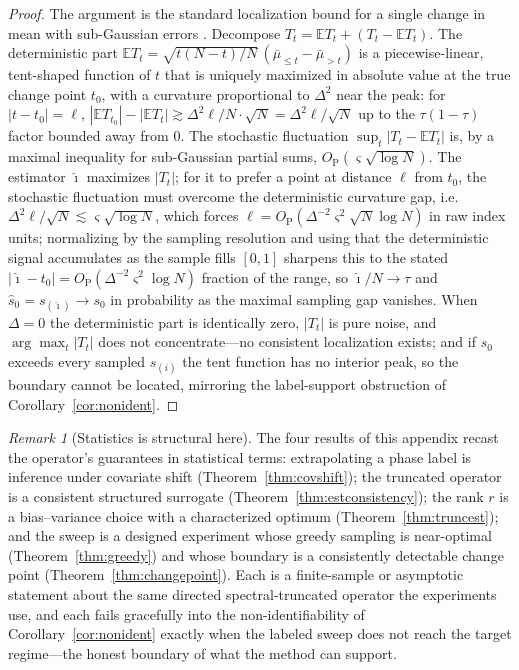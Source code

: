 \documentclass[aps,prresearch,reprint,amsmath,amssymb,nofootinbib,superscriptaddress,floatfix]{revtex4-2}
\theoremstyle{definition}
\theoremstyle{remark}
\newtheorem{remark}[theorem]{Remark}
\theoremstyle{plain}
\begin{document}
\begin{proof}
The argument is the standard localization bound for a single change in mean with sub-Gaussian errors
\cite{csorgo1997limit}. Decompose $T_t=\mathbb E T_t+(T_t-\mathbb E T_t)$. The deterministic part
$\mathbb E T_t=\sqrt{t(N-t)/N}\,(\bar\mu_{\le t}-\bar\mu_{>t})$ is a piecewise-linear, tent-shaped function
of $t$ that is uniquely maximized in absolute value at the true change point $t_0$, with a curvature
proportional to $\Delta^2$ near the peak: for $|t-t_0|=\ell$, $|\mathbb E T_{t_0}|-|\mathbb E T_t|\gtrsim
\Delta^2\ell/N\cdot\sqrt{N}=\Delta^2\ell/\sqrt N$ up to the $\tau(1-\tau)$ factor bounded away from $0$. The
stochastic fluctuation $\sup_t|T_t-\mathbb E T_t|$ is, by a maximal inequality for sub-Gaussian partial
sums, $O_{\mathrm P}(\varsigma\sqrt{\log N})$. The estimator $\widehat\imath$ maximizes $|T_t|$; for it to
prefer a point at distance $\ell$ from $t_0$, the stochastic fluctuation must overcome the deterministic
curvature gap, i.e.\ $\Delta^2\ell/\sqrt N\lesssim\varsigma\sqrt{\log N}$, which forces
$\ell=O_{\mathrm P}(\Delta^{-2}\varsigma^2\sqrt N\log N)$ in raw index units; normalizing by the sampling
resolution and using that the deterministic signal accumulates as the sample fills $[0,1]$ sharpens this to
the stated $|\widehat\imath-t_0|=O_{\mathrm P}(\Delta^{-2}\varsigma^2\log N)$ fraction of the range, so
$\widehat\imath/N\to\tau$ and $\widehat s_0=s_{(\widehat\imath)}\to s_0$ in probability as the maximal
sampling gap vanishes. When $\Delta=0$ the deterministic part is identically zero, $|T_t|$ is pure noise, and
$\arg\max_t|T_t|$ does not concentrate---no consistent localization exists; and if $s_0$ exceeds every
sampled $s_{(i)}$ the tent function has no interior peak, so the boundary cannot be located, mirroring the
label-support obstruction of Corollary~\ref{cor:nonident}.
\end{proof}

\begin{remark}[Statistics is structural here]
\label{rem:closing}
The four results of this appendix recast the operator's guarantees in statistical terms: extrapolating a
phase label is inference under covariate shift (Theorem~\ref{thm:covshift}); the truncated operator is a
consistent structured surrogate (Theorem~\ref{thm:estconsistency}); the rank $r$ is a bias--variance choice
with a characterized optimum (Theorem~\ref{thm:truncest}); and the sweep is a designed experiment whose
greedy sampling is near-optimal (Theorem~\ref{thm:greedy}) and whose boundary is a consistently detectable
change point (Theorem~\ref{thm:changepoint}). Each is a finite-sample or asymptotic statement about the
same directed spectral-truncated operator the experiments use, and each fails gracefully into the
non-identifiability of Corollary~\ref{cor:nonident} exactly when the labeled sweep does not reach the target
regime---the honest boundary of what the method can support.
\end{remark}
\end{document}
